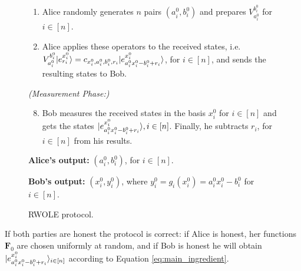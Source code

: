 \begin{figure}[h!]
\begin{tcolorbox}
\begin{enumerate}
        \item Alice randomly generates $n$ pairs $(a^0_i, b^0_i)$ and prepares  $V^{b^0_i}_{a^0_i}$ for $i\in[n]$.
        
        \item Alice applies these operators to the received states, i.e. $V^{b^0_i}_{a^0_i} | e^{x^0_i}_{r_i} \rangle = c_{x^0_i,a^0_i,b^0_i,r_i} | e^{x^0_i}_{a^0_i x^0_i - b^0_i + r_i} \rangle$, for $i\in[n]$, and sends the resulting states to Bob.
        
    \end{enumerate}
    \textit{(Measurement Phase:)}
    \begin{enumerate}
    \setcounter{enumi}{7}  
    
        \item Bob measures the received states in the basis $x^0_i$ for $i\in[n]$  and gets the states $| e^{x^0_i}_{a^0_i x^0_i - b^0_i+r_i} \rangle, i\in [n]$. Finally, he subtracts $r_i$, for $i\in[n]$ from his results.
        
    \end{enumerate}

    
    \textbf{Alice's output:} $(a^0_i, b^0_i)$, for $i \in [n]$.
    
    \textbf{Bob's output:} $(x^0_i, y^0_i)$, where $y^0_i=g_i(x^0_i) = a^0_i x^0_i - b^0_i$ for $i \in [n]$.
        
        \end{tcolorbox}
\caption{RWOLE protocol.}
\label{fig:wrole}
\end{figure}


If both parties are honest the  protocol is correct: if Alice is honest, her functions $\mathbf{F}_0$ are chosen uniformly at random, and if Bob is honest he will obtain $| e^{x^0_i}_{a^0_ix^0_i - b^0_i + r_i} \rangle_{i\in [n]}$ according to Equation \eqref{eq:main_ingredient}.
 
 
 


